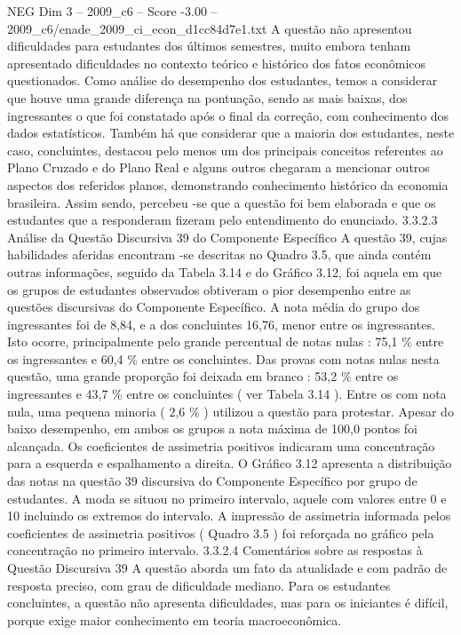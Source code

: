 \begin{textsample}{NEG Dim 3 – 2009\_c6 – Score -3.00 – 2009\_c6/enade\_2009\_ci\_econ\_d1cc84d7e1.txt}
A questão não apresentou dificuldades para estudantes dos últimos semestres, muito embora tenham apresentado dificuldades no contexto teórico e histórico dos fatos econômicos questionados.
Como análise do desempenho dos estudantes, temos a considerar que houve uma grande diferença na pontuação, sendo as mais baixas, dos ingressantes o que foi constatado após o final da correção, com conhecimento dos dados estatísticos.
Também há que considerar que a maioria dos estudantes, neste caso, concluintes, destacou pelo menos um dos principais conceitos referentes ao Plano Cruzado e do Plano Real e alguns outros chegaram a mencionar outros aspectos dos referidos planos, demonstrando conhecimento histórico da economia brasileira.
Assim sendo, percebeu -se que a questão foi bem elaborada e que os estudantes que a responderam fizeram pelo entendimento do enunciado. 3.3.2.3 Análise da Questão Discursiva 39 do Componente Específico A questão 39, cujas habilidades aferidas encontram -se descritas no Quadro 3.5, que ainda contém outras informações, seguido da Tabela 3.14 e do Gráfico 3.12, foi aquela em que os grupos de estudantes observados obtiveram o pior desempenho entre as questões discursivas do Componente Específico.
A nota média do grupo dos ingressantes foi de 8,84, e a dos concluintes 16,76, menor entre os ingressantes.
Isto ocorre, principalmente pelo grande percentual de notas nulas : 75,1 \% entre os ingressantes e 60,4 \% entre os concluintes.
Das provas com notas nulas nesta questão, uma grande proporção foi deixada em branco : 53,2 \% entre os ingressantes e 43,7 \% entre os concluintes ( ver Tabela 3.14 ).
Entre os com nota nula, uma pequena minoria ( 2,6 \% ) utilizou a questão para protestar.
Apesar do baixo desempenho, em ambos os grupos a nota máxima de 100,0 pontos foi alcançada.
Os coeficientes de assimetria positivos indicaram uma concentração para a esquerda e espalhamento a direita.
O Gráfico 3.12 apresenta a distribuição das notas na questão 39 discursiva do Componente Específico por grupo de estudantes.
A moda se situou no primeiro intervalo, aquele com valores entre 0 e 10 incluindo os extremos do intervalo.
A impressão de assimetria informada pelos coeficientes de assimetria positivos ( Quadro 3.5 ) foi reforçada no gráfico pela concentração no primeiro intervalo. 3.3.2.4 Comentários sobre as respostas à Questão Discursiva 39 A questão aborda um fato da atualidade e com padrão de resposta preciso, com grau de dificuldade mediano.
Para os estudantes concluintes, a questão não apresenta dificuldades, mas para os iniciantes é difícil, porque exige maior conhecimento em teoria macroeconômica.

\end{textsample}
